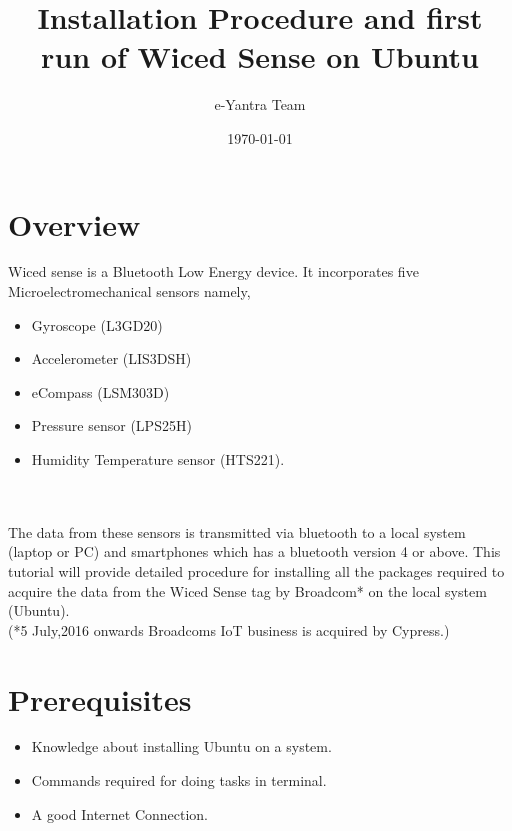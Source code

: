 \documentclass[11pt,a4paper]{article}
\begin{document}
\begin{titlepage}
\title{Installation Procedure and first run of Wiced Sense on Ubuntu}
\author{e-Yantra Team}
\date{\today}
\maketitle
\end{titlepage}

    \tableofcontents
    \newpage
	\section{Overview}
	 {\Large \hspace{7mm} Wiced sense is a Bluetooth Low Energy device. It incorporates five Microelectromechanical sensors namely,
	 \begin{itemize}
	 \\\item Gyroscope (L3GD20)\\ \item Accelerometer (LIS3DSH)\\\item eCompass (LSM303D)\\\item Pressure sensor (LPS25H)\\\item Humidity Temperature sensor (HTS221).
	 \end{itemize}\\ \\The data from these sensors is transmitted via bluetooth to a local system (laptop or PC) and smartphones which has a bluetooth version 4 or above.
	 This tutorial will provide detailed procedure for installing all the packages required to acquire the data from the Wiced Sense tag by Broadcom* on the local system (Ubuntu).\\ (*5 July,2016 onwards Broadcoms IoT business is acquired by Cypress.)}
	 
	\newpage
	\section{Prerequisites}
	\begin{itemize}
	\item Knowledge about installing Ubuntu on a system.
	\item Commands required for doing tasks in terminal.
	\item A good Internet Connection.
	\end{itemize}
	
\end{document}
